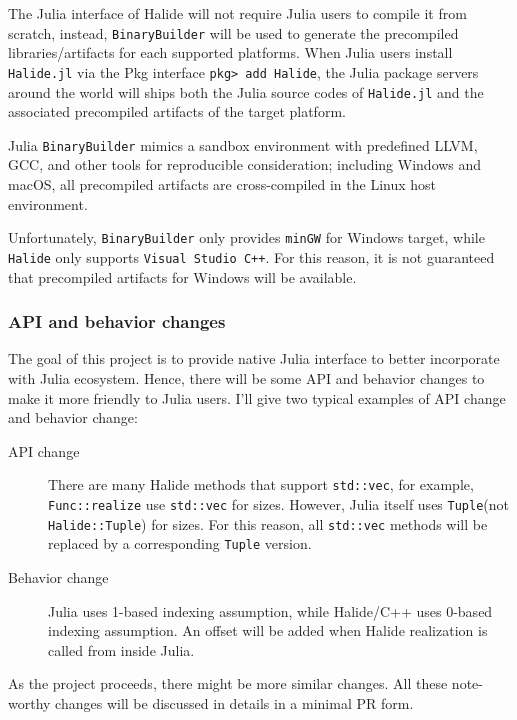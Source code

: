 \documentclass{article}
\begin{document}
The Julia interface of Halide will not require Julia users to compile it from scratch, instead, \lstinline{BinaryBuilder} will be used to generate the precompiled libraries/artifacts for each supported platforms. When Julia users install \lstinline{Halide.jl} via the Pkg interface \lstinline{pkg> add Halide}, the Julia package servers around the world will ships both the Julia source codes of \lstinline{Halide.jl} and the associated precompiled artifacts of the target platform.

Julia \lstinline{BinaryBuilder} mimics a sandbox environment with predefined LLVM, GCC, and other tools for reproducible consideration; including Windows and macOS, all precompiled artifacts are cross-compiled in the Linux host environment.

Unfortunately, \lstinline{BinaryBuilder} only provides \lstinline{minGW} for Windows target, while \lstinline{Halide} only supports \lstinline{Visual Studio C++}. For this reason, it is not guaranteed that precompiled artifacts for Windows will be available.

\subsubsection{API and behavior changes}

The goal of this project is to provide native Julia interface to better incorporate with Julia ecosystem. Hence, there will be some API and behavior changes to make it more friendly to Julia users. I'll give two typical examples of API change and behavior change:

\begin{description}
    \item[API change] There are many Halide methods that support \lstinline{std::vec}, for example, \lstinline{Func::realize} use \lstinline{std::vec} for sizes. However, Julia itself uses \lstinline{Tuple}(not \lstinline{Halide::Tuple}) for sizes. For this reason, all \lstinline{std::vec} methods will be replaced by a corresponding \lstinline{Tuple} version.
    \item[Behavior change] Julia uses 1-based indexing assumption, while Halide/C++ uses 0-based indexing assumption. An offset will be added when Halide realization is called from inside Julia.
\end{description}

As the project proceeds, there might be more similar changes. All these note-worthy changes will be discussed in details in a minimal PR form.
\end{document}
